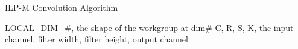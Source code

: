 \documentclass{article}
\begin{document}





\begin{algorithm}
\caption{ILP-M Convolution Algorithm \label{ILP-M}}
\begin{algorithmic}[1]

\Variables
 \State LOCAL\_DIM\_\#, the shape of the workgroup at dim\#
 \State C, R, S, K, the input channel, filter width, filter height, output channel
\EndVariables
\State
{}
    
    
        
        \State 
        
        \State {}
        \State {}
        \State 
        
 

\end{algorithmic}
\end{algorithm}
\end{document}
